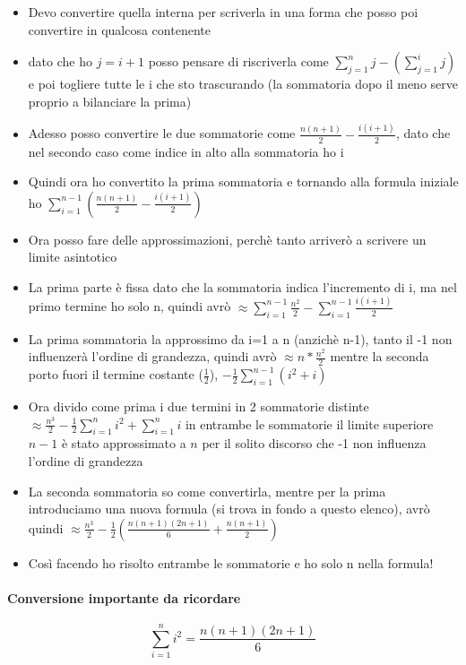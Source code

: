 \begin{itemize}
    \item Devo convertire quella interna per scriverla in una forma che posso poi convertire in qualcosa
    contenente
    \item dato che ho $j=i+1$ posso pensare di riscriverla come $\sum_{j=1}^n j - (\sum_{j=1}^i j)$ e poi togliere
    tutte le i che sto trascurando (la sommatoria dopo il meno serve proprio a bilanciare la prima)
    \item Adesso posso convertire le due sommatorie come $\frac{n(n+1)}{2}-\frac{i(i+1)}{2}$, dato che
    nel secondo caso come indice in alto alla sommatoria ho i
    \item Quindi ora ho convertito la prima sommatoria e tornando alla formula iniziale ho
    $\sum_{i=1}^{n-1} (\frac{n(n+1)}{2}-\frac{i(i+1)}{2})$
    \item Ora posso fare delle approssimazioni, perchè tanto arriverò a scrivere un limite asintotico
    \item La prima parte è fissa dato che la sommatoria indica l'incremento di i, ma nel primo termine ho
    solo n, quindi avrò $\approx \sum_{i=1}^{n-1} \frac{n^2}{2} - \sum_{i=1}^{n-1} \frac{i(i+1)}{2}$
    \item La prima sommatoria la approssimo da i=1 a n (anzichè n-1), tanto il -1 non influenzerà l'ordine
    di grandezza, quindi avrò $\approx n*\frac{n^2}{2}$ mentre la seconda porto fuori il termine costante ($\frac{1}{2}$),
     $ -\frac{1}{2}\sum_{i=1}^{n-1}(i^2 + i)$
    \item Ora divido come prima i due termini in 2 sommatorie distinte $\approx \frac{n^3}{2} -\frac{1}{2}
    \sum_{i=1}^n i^2 + \sum_{i=1}^n i$ in entrambe le sommatorie il limite superiore $n-1$ è stato approssimato
    a $n$ per il solito discorso che -1 non influenza l'ordine di grandezza
    \item La seconda sommatoria so come convertirla, mentre per la prima introduciamo una nuova formula 
    (si trova in fondo a questo elenco), avrò quindi $\approx \frac{n^3}{2}-\frac{1}{2}(\frac{n(n+1)(2n+1)}{6}+ 
    \frac{n(n+1)}{2})$
    \item Così facendo ho risolto entrambe le sommatorie e ho solo n nella formula!
\end{itemize}
\paragraph*{Conversione importante da ricordare}
\begin{equation*}
    \sum_{i=1}^n i^2 = \frac{n(n+1)(2n+1)}{6}
\end{equation*}
